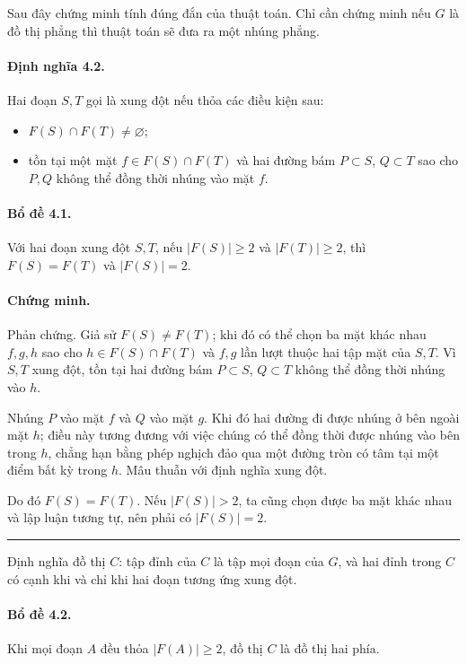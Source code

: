 \documentclass[11pt]{article}
\begin{document}
Sau đây chứng minh tính đúng đắn của thuật toán. Chỉ cần chứng minh nếu $G$ là
đồ thị phẳng thì thuật toán sẽ đưa ra một nhúng phẳng.

\paragraph{Định nghĩa 4.2.}
Hai đoạn $S,T$ gọi là xung đột nếu thỏa các điều kiện sau:
\begin{itemize}
  \item $F(S)\cap F(T)\ne\varnothing$;
  \item tồn tại một mặt $f\in F(S)\cap F(T)$ và hai đường bám $P\subset S$,
  $Q\subset T$ sao cho $P,Q$ không thể đồng thời nhúng vào mặt $f$.
\end{itemize}

\paragraph{Bổ đề 4.1.}
Với hai đoạn xung đột $S,T$, nếu $|F(S)|\ge 2$ và $|F(T)|\ge 2$, thì
$F(S)=F(T)$ và $|F(S)|=2$.

\paragraph{Chứng minh.}
Phản chứng. Giả sử $F(S)\ne F(T)$; khi đó có thể chọn ba mặt khác nhau
$f,g,h$ sao cho $h\in F(S)\cap F(T)$ và $f,g$ lần lượt thuộc hai tập mặt của
$S,T$. Vì $S,T$ xung đột, tồn tại hai đường bám $P\subset S$, $Q\subset T$
không thể đồng thời nhúng vào $h$.

Nhúng $P$ vào mặt $f$ và $Q$ vào mặt $g$. Khi đó hai đường đi được nhúng ở bên
ngoài mặt $h$; điều này tương đương với việc chúng có thể đồng thời được nhúng
vào bên trong $h$, chẳng hạn bằng phép nghịch đảo qua một đường tròn có tâm tại
một điểm bất kỳ trong $h$. Mâu thuẫn với định nghĩa xung đột.

Do đó $F(S)=F(T)$. Nếu $|F(S)|>2$, ta cũng chọn được ba mặt khác nhau và lập
luận tương tự, nên phải có $|F(S)|=2$.
\hfill\rule{0.55em}{0.55em}

Định nghĩa đồ thị $C$: tập đỉnh của $C$ là tập mọi đoạn của $G$, và hai đỉnh
trong $C$ có cạnh khi và chỉ khi hai đoạn tương ứng xung đột.

\paragraph{Bổ đề 4.2.}
Khi mọi đoạn $A$ đều thỏa $|F(A)|\ge 2$, đồ thị $C$ là đồ thị hai phía.
\end{document}
